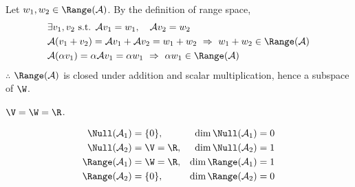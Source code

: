 \begin{claim}
\end{claim}
Let $w_1,w_2\in\Range(\mathcal{A})$. By the definition of range space,
\begin{align*}
&\exists v_1,v_2 \text{ s.t. } \mathcal{A}v_1=w_1, \quad \mathcal{A}v_2=w_2\\
&\mathcal{A}(v_1+v_2)=\mathcal{A}v_1+\mathcal{A}v_2=w_1+w_2 \ \Rightarrow\ w_1+w_2\in\Range(\mathcal{A})\\
&\mathcal{A}(\alpha v_1)=\alpha\mathcal{A}v_1=\alpha w_1 \ \Rightarrow\ \alpha w_1\in\Range(\mathcal{A})
\end{align*}
$\therefore$ $\Range(\mathcal{A})$ is closed under addition and scalar multiplication, hence a subspace of $\W$.

\begin{example}\leavevmode{}
$\V=\W=\R$.
\begin{center}
\begin{minipage}{0.36\textwidth}\centering
{}
\end{minipage}%
\begin{minipage}{0.6\textwidth}
\begin{align*}
\Null(\mathcal{A}_1)&=\{0\}, & \dim\Null(\mathcal{A}_1)&=0\\
\Null(\mathcal{A}_2)&=\V=\R, & \dim\Null(\mathcal{A}_2)&=1\\
\Range(\mathcal{A}_1)&=\W=\R, & \dim\Range(\mathcal{A}_1)&=1\\
\Range(\mathcal{A}_2)&=\{0\}, & \dim\Range(\mathcal{A}_2)&=0
\end{align*}
\end{minipage}
\end{center}
\end{example}

